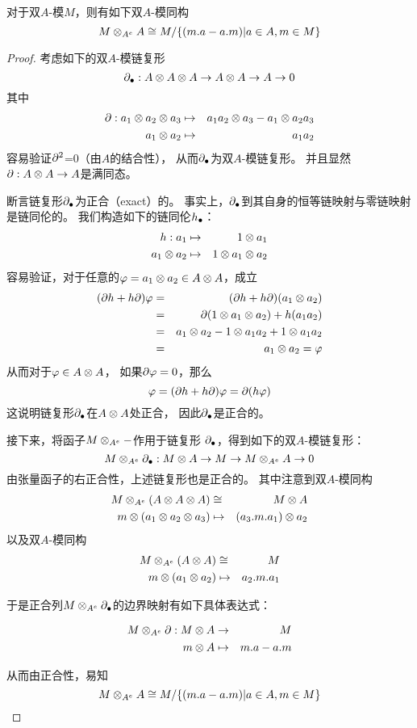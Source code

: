 \begin{prop}
对于双$A$-模$M$，则有如下双$A$-模同构
$$M\otimes_{A^e}A\cong M/\{(m.a-a.m)|a\in A,m\in M\}$$
\label{双模的余中心的结构prop}
\end{prop}

\begin{proof}
考虑如下的双$A$-模链复形
$$\partial_{\bullet}:A\otimes A\otimes A\rightarrow A\otimes A\rightarrow A\rightarrow 0$$
其中
\begin{eqnarray*}
\partial:a_1\otimes a_2\otimes a_3 &\mapsto& a_1a_2\otimes a_3-a_1\otimes a_2a_3\\
a_1\otimes a_2&\mapsto&a_1a_2
\end{eqnarray*}
容易验证$\partial^2$=0（由$A$的结合性），
从而$\partial_{\bullet}$为双$A$-模链复形。
并且显然$\partial:A\otimes A\rightarrow A$是满同态。

断言链复形$\partial_{\bullet}$为正合（exact）的。
事实上，$\partial_{\bullet}$到其自身的恒等链映射与零链映射是链同伦的。
我们构造如下的链同伦$h_{\bullet}$：
\begin{eqnarray*}
h:a_1&\mapsto&1\otimes a_1\\
a_1\otimes a_2&\mapsto&1\otimes a_1\otimes a_2
\end{eqnarray*}
容易验证，对于任意的$\varphi=a_1\otimes a_2\in A\otimes A$，成立
\begin{eqnarray*}
   (\partial h+h\partial)\varphi
&=&(\partial h+h\partial)(a_1\otimes a_2)\\
&=&\partial(1\otimes a_1\otimes a_2)+h(a_1a_2)\\
&=&a_1\otimes a_2-1\otimes a_1a_2+1\otimes a_1a_2\\
&=&a_1\otimes a_2=\varphi\\
\end{eqnarray*}
从而对于$\varphi\in A\otimes A$，
如果$\partial\varphi=0$，那么
$$\varphi=(\partial h+h\partial)\varphi=\partial(h\varphi)$$
这说明链复形$\partial_{\bullet}$在$A\otimes A$处正合，
因此$\partial_{\bullet}$是正合的。\vs

接下来，将函子$M\otimes_{A^e}-$作用于链复形
$\partial_{\bullet}$，得到如下的双$A$-模链复形：
$$M\otimes_{A^e}\partial_{\bullet}:
M\otimes A\rightarrow M\rightarrow M\otimes_{A^e}A\rightarrow 0$$
由张量函子的右正合性，上述链复形也是正合的。
其中注意到双$A$-模同构
\begin{eqnarray*}
M\otimes_{A^e}(A\otimes A\otimes A)&\cong& M\otimes A\\
m\otimes(a_1\otimes a_2\otimes a_3)&\mapsto&(a_3.m.a_1)\otimes a_2
\end{eqnarray*}
以及双$A$-模同构
\begin{eqnarray*}
M\otimes_{A^e}(A\otimes A)&\cong& M\\
m\otimes(a_1\otimes a_2)&\mapsto& a_2.m.a_1
\end{eqnarray*}

于是正合列$M\otimes_{A^e}\partial_{\bullet}$的边界映射有如下具体表达式：

\begin{eqnarray*}
M\otimes_{A^e}\partial:
M\otimes A&\to& M\\
m\otimes A&\mapsto&m.a-a.m
\end{eqnarray*}

从而由正合性，易知
$$M\otimes_{A^e}A\cong M/\{(m.a-a.m)|a\in A,m\in M\}$$
\end{proof}

